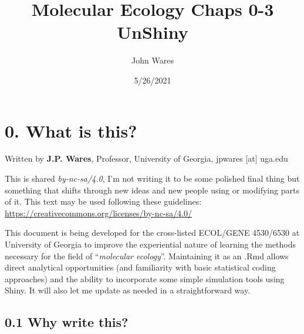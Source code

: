 \documentclass[
]{article}
\title{Molecular Ecology Chaps 0-3 UnShiny}
\author{John Wares}
\date{5/26/2021}
\begin{document}
\maketitle

\hypertarget{what-is-this}{%
\section{0. What is this?}\label{what-is-this}}

Written by \textbf{J.P. Wares}, Professor, University of Georgia,
jpwares {[}at{]} uga.edu

This is shared \emph{by-nc-sa/4.0}, I'm not writing it to be some
polished final thing but something that shifts through new ideas and new
people using or modifying parts of it. This text may be used following
these guidelines:
\url{https://creativecommons.org/licenses/by-nc-sa/4.0/}

This document is being developed for the cross-listed ECOL/GENE
4530/6530 at University of Georgia to improve the experiential nature of
learning the methods necessary for the field of ``\emph{molecular
ecology}''. Maintaining it as an .Rmd allows direct analytical
opportunities (and familiarity with basic statistical coding approaches)
and the ability to incorporate some simple simulation tools using Shiny.
It will also let me update as needed in a straightforward way.

\hypertarget{why-write-this}{%
\subsection{0.1 Why write this?}\label{why-write-this}}
\end{document}
